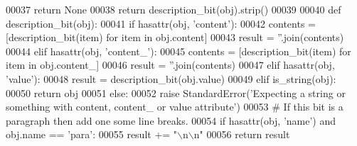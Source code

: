 \begin{DoxyCode}
00037         \textcolor{keywordflow}{return} \textcolor{keywordtype}{None}
00038     \textcolor{keywordflow}{return} description_bit(obj).strip()
00039 
00040 \textcolor{keyword}{def }description_bit(obj):
00041     \textcolor{keywordflow}{if} hasattr(obj, \textcolor{stringliteral}{'content'}):
00042         contents = [description_bit(item) \textcolor{keywordflow}{for} item \textcolor{keywordflow}{in} obj.content]
00043         result = \textcolor{stringliteral}{''}.join(contents)
00044     \textcolor{keywordflow}{elif} hasattr(obj, \textcolor{stringliteral}{'content\_'}):
00045         contents = [description_bit(item) \textcolor{keywordflow}{for} item \textcolor{keywordflow}{in} obj.content\_]
00046         result = \textcolor{stringliteral}{''}.join(contents)
00047     \textcolor{keywordflow}{elif} hasattr(obj, \textcolor{stringliteral}{'value'}):
00048         result = description_bit(obj.value)
00049     \textcolor{keywordflow}{elif} is_string(obj):
00050         \textcolor{keywordflow}{return} obj
00051     \textcolor{keywordflow}{else}:
00052         \textcolor{keywordflow}{raise} StandardError(\textcolor{stringliteral}{'Expecting a string or something with content, content\_ or value attribute'})
00053     \textcolor{comment}{# If this bit is a paragraph then add one some line breaks.}
00054     \textcolor{keywordflow}{if} hasattr(obj, \textcolor{stringliteral}{'name'}) \textcolor{keywordflow}{and} obj.name == \textcolor{stringliteral}{'para'}:
00055         result += \textcolor{stringliteral}{"\(\backslash\)n\(\backslash\)n"}
00056     \textcolor{keywordflow}{return} result
\end{DoxyCode}
